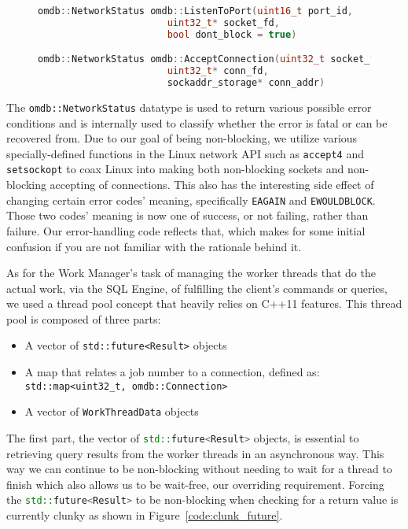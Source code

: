 \documentclass[letterpaper, 12pt]{article}
\newcommand{\inlinecode}[1]{\colorbox{codegrey}{\lstinline[language=C++]{#1}}}
\begin{document}
  \begin{figure}
  \label{code:work_manager_func_def}
  \begin{lstlisting}[language=C++]
omdb::NetworkStatus omdb::ListenToPort(uint16_t port_id,
				       uint32_t* socket_fd,
				       bool dont_block = true)

omdb::NetworkStatus omdb::AcceptConnection(uint32_t socket_fd,
					   uint32_t* conn_fd,
					   sockaddr_storage* conn_addr)
  \end{lstlisting}
  \end{figure}
  The \lstinline[basicstyle=\ttfamily]|omdb::NetworkStatus| datatype is used to return various
  possible error conditions and is internally used to classify whether the error is fatal
  or can be recovered from. Due to our goal of being non-blocking, we utilize various specially-defined
  functions in the Linux network API such as \lstinline[basicstyle=\ttfamily]|accept4| and
  \lstinline[basicstyle=\ttfamily]|setsockopt| to coax Linux into making both non-blocking
  sockets and non-blocking accepting of connections. This also has the interesting side effect of
  changing certain error codes' meaning, specifically \lstinline[basicstyle=\ttfamily]|EAGAIN| and
  \lstinline[basicstyle=\ttfamily]|EWOULDBLOCK|. Those two codes' meaning is now one of success, or not
  failing, rather than failure. Our error-handling code reflects that, which makes for some initial
  confusion if you are not familiar with the rationale behind it.
  \par\vspace{\baselineskip}
  As for the Work Manager's task of managing the worker threads that do the actual work, via the
  SQL Engine, of fulfilling the client's commands or queries, we used a thread pool concept that
  heavily relies on C++11 features. This thread pool is composed of three parts:
  \begin{itemize}
   \item A vector of \lstinline[]|std::future<Result>| objects
   \item A map that relates a job number to a connection, defined as:\\
	 \lstinline[]|std::map<uint32_t, omdb::Connection>|
   \item A vector of \lstinline[]|WorkThreadData| objects
  \end{itemize}
  The first part, the vector of \inlinecode{std::future<Result>} objects, is
  essential to retrieving query results from the worker threads in an asynchronous way. This way
  we can continue to be non-blocking without needing to wait for a thread to finish which also
  allows us to be wait-free, our overriding requirement. Forcing the \inlinecode{std::future<Result>}
  to be non-blocking when checking for a return value is currently clunky as shown in Figure~\ref{code:clunk_future}.
  \par\vspace{\baselineskip}
  
\end{document}
